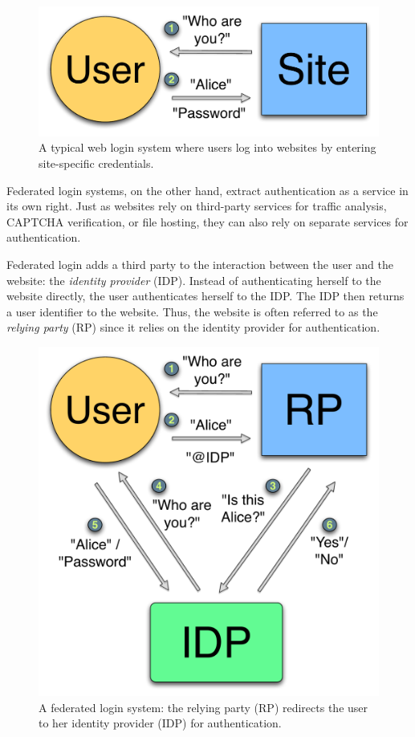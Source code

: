 \documentclass{llncs}
\begin{document}
\begin{figure}
  \centering
  \includegraphics[scale=0.5]{figs/fig-passwd-color.pdf}
  \caption{A typical  web login system where users log into websites
    by entering site-specific credentials.}
  \label{fig:passwd}
\end{figure}

Federated login systems, on the other hand, extract authentication as
a service in its own right. Just as websites rely on third-party services
for traffic analysis, CAPTCHA verification, or file hosting, they can
also rely on separate services for authentication.

Federated login adds a third party to the interaction between the user
and the website: the \emph{identity provider} (IDP). Instead of
authenticating herself to the website directly, the user authenticates
herself to the IDP. The IDP then returns a user identifier to the
website. Thus, the website is often referred to as the \emph{relying
  party} (RP) since it relies on the identity provider for
authentication.

\begin{figure}
  \centering
  \includegraphics[scale=0.5]{figs/fig-fedlog-color.pdf}
  \caption{A federated login system: the relying party (RP) redirects
  the user to her identity provider (IDP) for authentication.}
  \label{fig:fedlog}
\end{figure}
\end{document}
